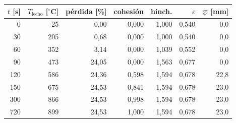 \begin{tabular}{rrrrrrr}
    \hline
    $t$ [s] & $T_\text{lecho}$ [$^\circ$C] & pérdida [\%] & cohesión & hinch. & $\varepsilon$ & $\varnothing$ [mm] \\
    \hline
    0 & 25 & 0,00 & 0,000 & 1,000 & 0,540 & 0,0 \\
    30 & 205 & 0,68 & 0,000 & 1,000 & 0,540 & 0,0 \\
    60 & 352 & 3,14 & 0,000 & 1,039 & 0,552 & 0,0 \\
    90 & 473 & 24,05 & 0,000 & 1,563 & 0,677 & 0,0 \\
    120 & 586 & 24,36 & 0,598 & 1,594 & 0,678 & 22,8 \\
    150 & 675 & 24,53 & 0,841 & 1,594 & 0,678 & 23,0 \\
    300 & 866 & 24,53 & 0,998 & 1,594 & 0,678 & 23,0 \\
    720 & 899 & 24,53 & 1,000 & 1,594 & 0,678 & 23,0 \\
    \hline
\end{tabular}
